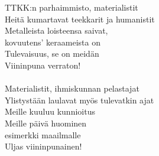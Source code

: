 
            TTKK:n parhaimmisto, materialistit \\
            Heitä kumartavat teekkarit ja humanistit \\
            Metalleista loisteensa saivat, \\
            kovuutens’ keraameista on \\
            Tulevaisuus, se on meidän \\
            Viininpuna verraton! \\
\hspace{10mm} \\
            Materialistit, ihmiskunnan pelastajat \\
            Ylistystään laulavat myös tulevatkin ajat \\
            Meille kuuluu kunnioitus \\
            Meille päivä huominen \\
            esimerkki maailmalle \\
            Uljas viininpunainen! \\
